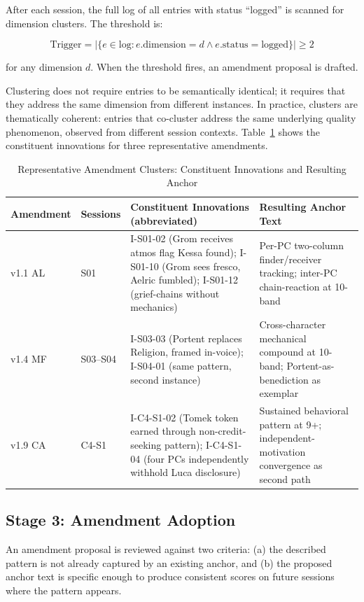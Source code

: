 After each session, the full log of all entries with status ``logged'' is scanned for
dimension clusters. The threshold is:

\[
  \text{Trigger} = |\{e \in \text{log} : e.\text{dimension} = d \land e.\text{status} = \text{logged}\}| \geq 2
\]

for any dimension $d$. When the threshold fires, an amendment proposal is drafted.

Clustering does not require entries to be semantically identical; it requires that
they address the same dimension from different instances. In practice, clusters are
thematically coherent: entries that co-cluster address the same underlying quality
phenomenon, observed from different session contexts. Table~\ref{tab:cluster-examples}
shows the constituent innovations for three representative amendments.

\begin{table}[t]
\caption{Representative Amendment Clusters: Constituent Innovations and Resulting Anchor}
\label{tab:cluster-examples}
\begin{tabular}{@{}llp{5cm}p{5cm}@{}}
\toprule
Amendment & Sessions & Constituent Innovations (abbreviated) & Resulting Anchor Text \\
\midrule
v1.1 AL & S01 & I-S01-02 (Grom receives atmos flag Kessa found); I-S01-10 (Grom sees fresco, Aelric fumbled); I-S01-12 (grief-chains without mechanics) & Per-PC two-column finder/receiver tracking; inter-PC chain-reaction at 10-band \\
v1.4 MF & S03–S04 & I-S03-03 (Portent replaces Religion, framed in-voice); I-S04-01 (same pattern, second instance) & Cross-character mechanical compound at 10-band; Portent-as-benediction as exemplar \\
v1.9 CA & C4-S1 & I-C4-S1-02 (Tomek token earned through non-credit-seeking pattern); I-C4-S1-04 (four PCs independently withhold Luca disclosure) & Sustained behavioral pattern at 9+; independent-motivation convergence as second path \\
\bottomrule
\end{tabular}
\end{table}

\subsection{Stage 3: Amendment Adoption}

An amendment proposal is reviewed against two criteria: (a) the described pattern is
not already captured by an existing anchor, and (b) the proposed anchor text is
specific enough to produce consistent scores on future sessions where the pattern appears.

